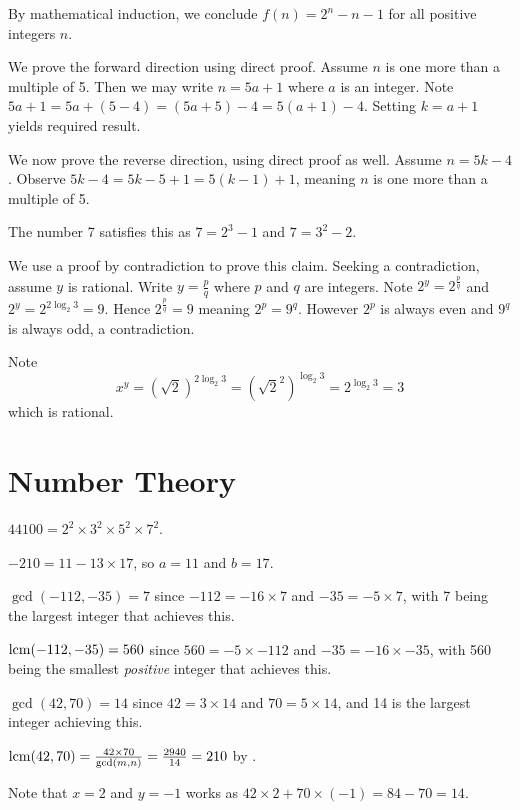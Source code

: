 \begin{questions}
    By mathematical induction, we conclude $f(n) = 2^n - n - 1$ for all positive integers $n$.
    
    \item We prove the forward direction using direct proof. Assume $n$ is one more than a multiple of 5. Then we may write $n = 5a + 1$ where $a$ is an integer. Note $5a + 1 = 5a + (5 - 4) = (5a + 5) - 4 = 5(a+1) - 4$. Setting $k = a+1$ yields required result.
    
    We now prove the reverse direction, using direct proof as well. Assume $n = 5k - 4$. Observe $5k - 4 = 5k - 5 + 1 = 5(k-1) + 1$, meaning $n$ is one more than a multiple of 5.
    
    \item The number 7 satisfies this as $7 = 2^3 - 1$ and $7 = 3^2 - 2$.
    
    \item \begin{partquestions}{\roman*}
        \item We use a proof by contradiction to prove this claim. Seeking a contradiction, assume $y$ is rational. Write $y = \frac pq$ where $p$ and $q$ are integers. Note $2^y = 2^{\frac pq}$ and $2^y = 2^{2\log_2{3}} = 9$. Hence $2^{\frac pq} = 9$ meaning $2^p = 9^q$. However $2^p$ is always even and $9^q$ is always odd, a contradiction.
        \item Note
        \[
            x^y = (\sqrt2)^{2\log_2{3}} = \left(\sqrt{2}^2\right)^{\log_2{3}} = 2^{\log_2{3}} = 3        
        \]
        which is rational.
    \end{partquestions}
\end{questions}

\section{Number Theory}
\begin{questions}
    \item $44100 = 2^2 \times 3^2 \times 5^2 \times 7^2$.
    \item $-210 = 11 - 13 \times 17$, so $a = 11$ and $b = 17$.
    \item $\gcd(-112, -35) = 7$ since $-112 = -16 \times 7$ and $-35 = -5 \times 7$, with 7 being the largest integer that achieves this.
    \item $\mathrm{lcm}(-112, -35) = 560$ since $560 = -5 \times -112$ and $-35 = -16 \times -35$, with 560 being the smallest \textit{positive} integer that achieves this.
    \item \begin{partquestions}{\roman*}
        \item $\gcd(42, 70) = 14$ since $42 = 3 \times 14$ and $70 = 5 \times 14$, and 14 is the largest integer achieving this.
        \item $\mathrm{lcm}(42, 70) = \frac{42 \times 70}{\gcd(m, n)} = \frac{2940}{14} = 210$ by .
        \item Note that $x = 2$ and $y = -1$ works as $42 \times 2 + 70 \times (-1) = 84 - 70 = 14$.
    \end{partquestions}
\end{questions}

